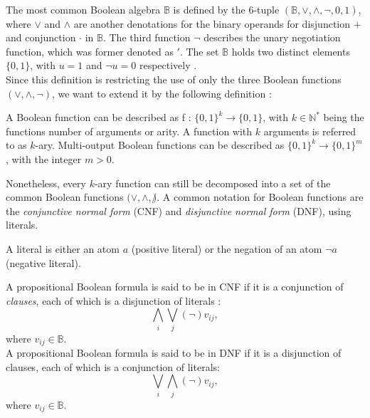The most common Boolean algebra $\mathbb{B}$ is defined by the 6-tuple $(\mathbb{B}, \vee, \wedge, \neg, 0, 1)$, where $\vee$ and $\wedge$ are another denotations for the binary operands for disjunction $+$ and conjunction $\cdot$ in $\mathbb{B}$. The third function $\neg$ describes the unary negotiation function, which was former denoted as $'$. The set $\mathbb{B}$ holds two distinct elements $\{0, 1\}$, with $u=1$ and $\neg u = 0$ respectively \cite{Boolean_def}.\\

Since this definition is restricting the use of only the three Boolean functions $(\vee, \wedge, \neg)$, we want to extend it by the following definition \cite{muti_output_boolean_function}:

\begin{definition}
A Boolean function can be described as f : $\{0, 1\}^k \to \{0, 1\}$, with $k \in \mathbb{N}^*$ being the functions number of arguments or arity. A function with $k$ arguments is referred to as $k$-ary. Multi-output Boolean functions can be described as $\{0, 1\}^k \to \{0, 1\}^m$, with the integer $m > 0$.
\end{definition}

Nonetheless, every $k$-ary function can still be decomposed into a set of the common Boolean functions $(\vee, \wedge, \not)$.
A common notation for Boolean functions are the \textit{conjunctive normal form} (CNF) and \textit{disjunctive normal form} (DNF), using literals.

\begin{definition}
	A literal is either an atom $a$ (positive literal) or the negation of an atom $\neg a$ (negative literal).
\end{definition}

\begin{definition}
A propositional Boolean formula is said to be in CNF if it is a conjunction of \textit{clauses}, each of which is a disjunction of literals \cite{CNF}:\\
\[\displaystyle\bigwedge_{i} \displaystyle\bigvee_{j} (\neg) v_{ij}, \]
where $v_{ij} \in \mathbb{B}$.\\
A propositional Boolean formula is said to be in DNF if it is a disjunction of clauses, each of which is a conjunction of literals:\\
\[ \displaystyle\bigvee_{i} \displaystyle\bigwedge_{j} (\neg) v_{ij}, \]
where $v_{ij} \in \mathbb{B}$.

\end{definition}

